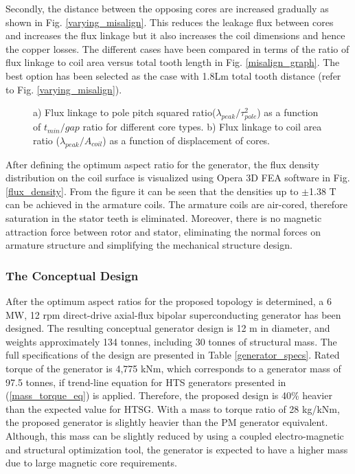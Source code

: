 \documentclass[final,peerreview,onecolumn]{IEEEtran}
\begin{document}
Secondly, the distance between the opposing cores are increased gradually as shown in Fig. \ref{varying_misalign}. This reduces the leakage flux between cores and increases the flux linkage but it also increases the coil dimensions and hence the copper losses. The different cases have been compared in terms of the ratio of flux linkage to coil area versus total tooth length in Fig. \ref{misalign_graph}. The best option has been selected as the case with 1.8Lm total tooth distance (refer to Fig. \ref{varying_misalign}).

\begin{figure}[!h]
\centerline{
\hfil
{}
}
\caption{a) Flux linkage to pole pitch squared ratio($ \lambda_{peak}/\tau_{pole}^2$) as a function of $ t_{min}/gap $ ratio for different core types.
b) Flux linkage to coil area ratio ($ \lambda_{peak}/A_{coil} $) as a function of displacement of cores.}
\end{figure}

After defining the optimum aspect ratio for the generator, the flux density distribution on the coil surface is visualized using Opera 3D FEA software in Fig. \ref{flux_density}. From the figure it can be seen that the densities up to $\pm$1.38 T can be achieved in the armature coils. The armature coils are air-cored, therefore saturation in the stator teeth is eliminated. Moreover, there is no magnetic attraction force between rotor and stator, eliminating the normal forces on armature structure and simplifying the mechanical structure design. 


\subsubsection{The Conceptual Design}

After the optimum aspect ratios for the proposed topology is determined, a 6 MW, 12 rpm direct-drive axial-flux bipolar superconducting generator has been designed. The resulting conceptual generator design is 12 m in diameter, and weights approximately 134 tonnes, including 30 tonnes of structural mass. The full specifications of the design are presented in Table \ref{generator_specs}. Rated torque of the generator is 4,775 kNm, which corresponds to a generator mass of 97.5 tonnes, if trend-line equation for HTS generators presented in (\ref{mass_torque_eq}) is applied. Therefore, the proposed design is 40\% heavier than the expected value for HTSG. With a mass to torque ratio of 28 kg/kNm, the proposed generator is slightly heavier than the PM generator equivalent. Although, this mass can be slightly reduced by using a coupled electro-magnetic and structural optimization tool, the generator is expected to have a higher mass due to large magnetic core requirements. 
\end{document}
